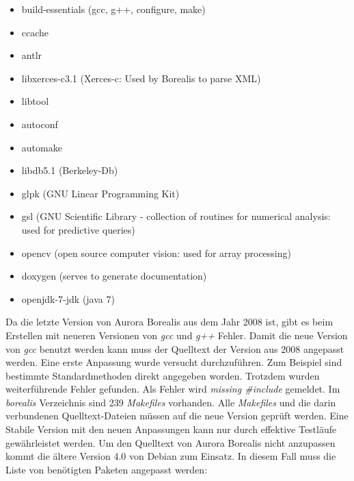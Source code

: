 \begin{itemize}
	\item build-essentials (gcc, g++, configure, make)
	\item ccache
	\item antlr
	\item libxerces-c3.1 (Xerces-c: Used by Borealis to parse XML)
	\item libtool
	\item autoconf
	\item automake
	\item libdb5.1 (Berkeley-Db)
	\item glpk (GNU Linear Programming Kit)
	\item gsl (GNU Scientific Library - collection of routines for numerical analysis: used for predictive queries)
	\item opencv (open source computer vision: used for array processing)
	\item doxygen (serves to generate documentation)
	\item openjdk-7-jdk (java 7)
\end{itemize}

Da die letzte Version von Aurora Borealis aus dem Jahr 2008 ist, gibt es beim Erstellen mit neueren Versionen von \textit{gcc} und \textit{g++} Fehler. 
Damit die neue Version von \textit{gcc} benutzt werden kann muss der Quelltext der Version aus 2008 angepasst werden. Eine erste Anpassung wurde versucht durchzuführen. Zum Beispiel sind bestimmte Standardmethoden direkt angegeben worden. Trotzdem wurden weiterführende Fehler gefunden. Als Fehler wird \textit{missing \#include} gemeldet. Im \textit{borealis} Verzeichnis sind 239 \textit{Makefiles} vorhanden. Alle \textit{Makefiles} und die darin verbundenen Quelltext-Dateien müssen auf die neue Version geprüft werden. Eine Stabile Version mit den neuen Anpassungen kann nur durch effektive Testläufe gewährleistet werden. Um den Quelltext von Aurora Borealis nicht anzupassen kommt die ältere Version 4.0 von Debian zum Einsatz. In diesem Fall muss die Liste von benötigten Paketen angepasst werden:

